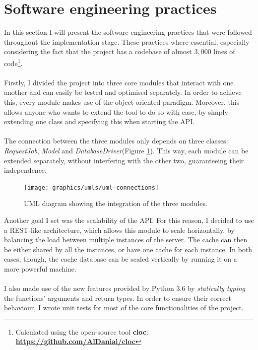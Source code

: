 	\section{Software engineering practices} \label{Section: impl/SoftEngPractices}
	In this section I will present the software engineering practices that were followed throughout the implementation stage. These practices where essential, especially considering the fact that the project has a codebase of almost $3,000$ lines of code\footnote{Calculated using the open-source tool \textbf{cloc}: \textbf{\url{https://github.com/AlDanial/cloc}}}. 
	\\ \\
	Firstly, I divided the project into three core modules that interact with one another and can easily be tested and optimised separately. In order to achieve this, every module makes use of the object-oriented paradigm. Moreover, this allows anyone who wants to extend the tool to do so with ease, by simply extending one class and specifying this when starting the API.  
	\\ \\
	The connection between the three modules only depends on three classes: \textit{RequestJob}, \textit{Model} and \textit{DatabaseDriver}(Figure \ref{Fig: impl/REST/API-integrate}). This way, each module can be extended separately, without interfering with the other two, guaranteeing their independence.  
	\begin{figure}[H]
		\centering
		\texttt{[image: graphics/umls/uml-connections]}
		\caption[General UML diagram]{\centering UML diagram showing the integration of the three modules.}
		\label{Fig: impl/REST/API-integrate}
	\end{figure}
	Another goal I set was the scalability of the API. For this reason, I decided to use a REST-like architecture, which allows this module to scale horizontally, by balancing the load between multiple instances of the server. The cache can then be either shared by all the instances, or have one cache for each instance. In both cases, though, the cache database can be scaled vertically by running it on a more powerful machine. 
	\\ \\
	I also made use of the new features provided by Python $3.6$ by \textit{statically typing} the functions' arguments and return types. In order to ensure their correct behaviour, I wrote unit tests for most of the core functionalities of the project.
